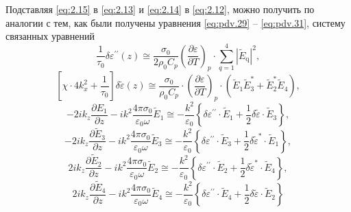 Подставляя \eqref{eq:2.15} в \eqref{eq:2.13} и \eqref{eq:2.14} в \eqref{eq:2.12}, можно получить по аналогии с тем,
как были получены уравнения \eqref{eq:pdv.29} -- \eqref{eq:pdv.31}, систему связанных уравнений
\begin{equation}
	\label{eq:2.16}
	\frac{1}{\tau_{0}} \delta \varepsilon^{\prime \prime}(z) \cong \frac{\sigma_{0}}{2 \rho_{0} C_{p}}\left(\frac{\partial \varepsilon}{\partial T}\right)_{p} \cdot \sum_{q=1}^{4}\left|\tilde{E}_{\mathrm{q}}\right|^{2},
\end{equation}
\begin{equation}
	\label{eq:2.17}
	\left[\chi \cdot 4 k_{x}^{2}+\frac{1}{\tau_{0}}\right] \delta \tilde{\varepsilon}(z) \cong \frac{\sigma_{0}}{\rho_{0} C_{p}} \cdot\left(\frac{\partial \varepsilon}{\partial T}\right)_{p} \cdot\left(\tilde{E}_{1} \tilde{E}_{3}^{*}+\tilde{E}_{2}^{*} \tilde{E}_{4}\right),
\end{equation}
\begin{equation}
	\label{eq:2.18}
	-2 i k_{z} \frac{\partial E_{1}}{\partial z}-i k^{2} \frac{4 \pi \sigma_{0}}{\varepsilon_{0} \omega} \tilde{E}_{1} \cong-\frac{k^{2}}{\varepsilon_{0}}\left\{\delta \varepsilon^{\prime \prime} \cdot \tilde{E}_{1}+\frac{1}{2} \delta \tilde{\varepsilon} \cdot \tilde{E}_{3}\right\},
\end{equation}
\begin{equation}
	\label{eq:2.19}
	-2 i k_{z} \frac{\partial \tilde{E}_{3}}{\partial z}-i k^{2} \frac{4 \pi \sigma_{0}}{\varepsilon_{0} \omega} \tilde{E}_{3} \cong-\frac{k^{2}}{\varepsilon_{0}}\left\{\delta \varepsilon^{\prime \prime} \cdot \tilde{E}_{3}+\frac{1}{2} \delta \tilde{\varepsilon}^{*} \cdot \tilde{E}_{1}\right\},
\end{equation}
\begin{equation}
	\label{eq:2.20}
	2 i k_{z} \frac{\partial \tilde{E}_{2}}{\partial z}-i k^{2} \frac{4 \pi \sigma_{0}}{\varepsilon_{0} \omega} \tilde{E}_{2} \cong-\frac{k^{2}}{\varepsilon_{0}}\left\{\delta \varepsilon^{\prime \prime} \cdot \tilde{E}_{2}+\frac{1}{2} \delta \tilde{\varepsilon}^{*} \cdot \tilde{E}_{4}\right\},
\end{equation}
\begin{equation}
	\label{eq:2.21}
	2 i k_{z} \frac{\partial \tilde{E}_{4}}{\partial z}-i k^{2} \frac{4 \pi \sigma_{0}}{\varepsilon_{0} \omega} \tilde{E}_{4} \cong-\frac{k^{2}}{\varepsilon_{0}}\left\{\delta \varepsilon^{\prime \prime} \cdot \tilde{E}_{4}+\frac{1}{2} \delta \tilde{\varepsilon} \cdot \tilde{E}_{2}\right\}
\end{equation}
